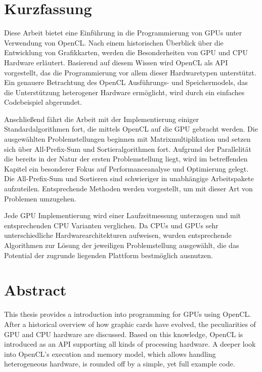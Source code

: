 \chapter*{Kurzfassung}

Diese Arbeit bietet eine Einführung in die Programmierung von GPUs unter Verwendung von OpenCL. Nach einem historischen Überblick über die Entwicklung von Grafikkarten, werden die Besonderheiten von GPU und CPU Hardware erläutert. Basierend auf diesem Wissen wird OpenCL als API vorgestellt, das die Programmierung vor allem dieser Hardwaretypen unterstützt. Ein genauere Betrachtung des OpenCL Ausführungs- und Speichermodels, das die Unterstützung heterogener Hardware ermöglicht, wird durch ein einfaches Codebeispiel abgerundet.

Anschließend fährt die Arbeit mit der Implementierung einiger Standardalgorithmen fort, die mittels OpenCL auf die GPU gebracht werden. Die ausgewählten Problemstellungen beginnen mit Matrixmultiplikation und setzen sich über All-Prefix-Sum und Sortieralgorithmen fort. Aufgrund der Parallelität die bereits in der Natur der ersten Problemstellung liegt, wird im betreffenden Kapitel ein besonderer Fokus auf Performanceanalyse und Optimierung gelegt. Die All-Prefix-Sum und Sortieren sind schwieriger in unabhängige Arbeitspakete aufzuteilen. Entsprechende Methoden werden vorgestellt, um mit dieser Art von Problemen umzugehen.

Jede GPU Implementierung wird einer Laufzeitmessung unterzogen und mit entsprechenden CPU Varianten verglichen. Da CPUs und GPUs sehr unterschiedliche Hardwarearchitekturen aufweisen, wurden entsprechende Algorithmen zur Lösung der jeweiligen Problemstellung ausgewählt, die das Potential der zugrunde liegenden Plattform bestmöglich ausnutzen.

\pagebreak

\chapter*{Abstract}

This thesis provides a introduction into programming for GPUs using OpenCL. After a historical overview of how graphic cards have evolved, the peculiarities of GPU and CPU hardware are discussed. Based on this knowledge, OpenCL is introduced as an API supporting all kinds of processing hardware. A deeper look into OpenCL's execution and memory model, which allows handling heterogeneous hardware, is rounded off by a simple, yet full example code.

